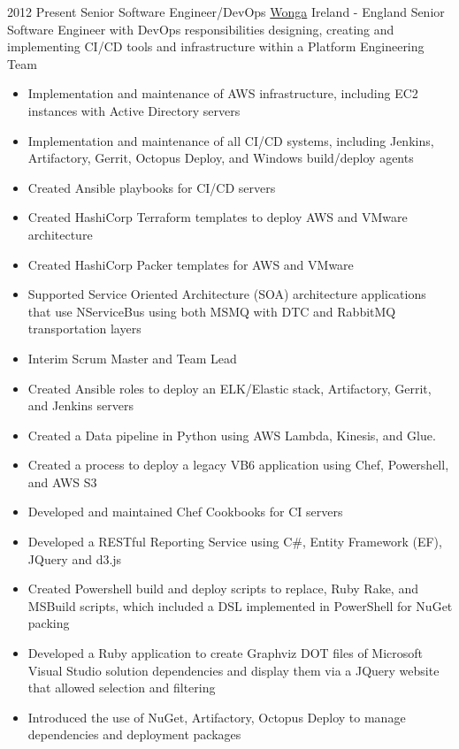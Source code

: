 \documentclass[a4paper]{twentysecondcv} %
\begin{document}
\begin{twenty} %
\twentyitem
      {2012}%
  {Present} %
    {Senior Software Engineer/DevOps} %
    {\href{https://www.wonga.com/}{Wonga}} %
    {Ireland - England} %
    {Senior Software Engineer with DevOps responsibilities designing, creating and implementing CI/CD tools and infrastructure within a Platform Engineering Team} %
  {\begin{itemize}
    \item Implementation and maintenance of AWS infrastructure, including EC2 instances with Active Directory servers
    \item Implementation and maintenance of all CI/CD systems, including Jenkins, Artifactory, Gerrit, Octopus Deploy, and Windows build/deploy agents
    \item Created Ansible playbooks for CI/CD servers
    \item Created HashiCorp Terraform templates to deploy AWS and VMware architecture
    \item Created HashiCorp Packer templates for AWS and VMware
    \item Supported Service Oriented Architecture (SOA) architecture applications that use NServiceBus using both MSMQ with DTC and RabbitMQ transportation layers
    \item Interim Scrum Master and Team Lead
  \end{itemize}
  } %
  {\begin{itemize}
      \item Created Ansible roles to deploy an ELK/Elastic stack, Artifactory, Gerrit, and Jenkins servers
    \item Created a Data pipeline in Python using AWS Lambda, Kinesis, and Glue.
    \item Created a process to deploy a legacy VB6 application using Chef, Powershell, and AWS S3
    \item Developed and maintained Chef Cookbooks for CI servers
    \item Developed a RESTful Reporting Service using C\#, Entity Framework (EF), JQuery and d3.js
    \item Created Powershell build and deploy scripts to replace, Ruby Rake, and MSBuild scripts, which included a DSL implemented in PowerShell for NuGet packing
    \item Developed a Ruby application to create Graphviz DOT files of Microsoft Visual Studio solution dependencies and display them via a JQuery website that allowed selection and filtering
    \item Introduced the use of NuGet, Artifactory, Octopus Deploy to manage dependencies and deployment packages
  \end{itemize}
  } %
\end{twenty}
\end{document}
